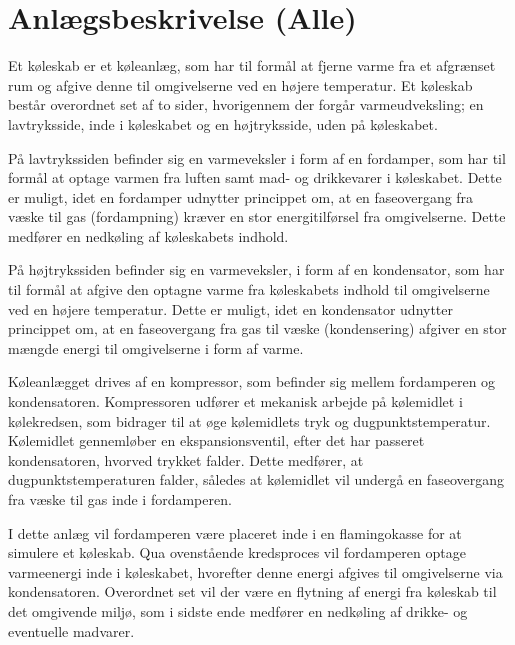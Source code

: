 \documentclass[../Hovedrapport.tex]{subfiles}
\begin{document}

\section{Anlægsbeskrivelse  (Alle)}
    \label{sec:anlaegsbeskrivelse}
Et køleskab er et køleanlæg, som har til formål at fjerne varme fra et afgrænset rum og afgive denne til omgivelserne ved en højere temperatur. Et køleskab består overordnet set af to sider, hvorigennem der forgår varmeudveksling; en lavtryksside, inde i køleskabet og en højtryksside, uden på køleskabet. 

På lavtrykssiden befinder sig en varmeveksler i form af en fordamper, som har til formål at optage varmen fra luften samt mad- og drikkevarer i køleskabet. Dette er muligt, idet en fordamper udnytter princippet om, at en faseovergang fra væske til gas (fordampning) kræver en stor energitilførsel fra omgivelserne. Dette medfører en nedkøling af køleskabets indhold.

På højtrykssiden befinder sig en varmeveksler, i form af en kondensator, som har til formål at afgive den optagne varme fra køleskabets indhold til omgivelserne ved en højere temperatur. Dette er muligt, idet en kondensator udnytter princippet om, at en faseovergang fra gas til væske (kondensering) afgiver en stor mængde energi til omgivelserne i form af varme.

Køleanlægget drives af en kompressor, som befinder sig mellem fordamperen og kondensatoren. Kompressoren udfører et mekanisk arbejde på kølemidlet i kølekredsen, som bidrager til at øge kølemidlets tryk og dugpunktstemperatur. Kølemidlet gennemløber en ekspansionsventil, efter det har passeret kondensatoren, hvorved trykket falder. Dette medfører, at dugpunktstemperaturen falder, således at kølemidlet vil undergå en faseovergang fra væske til gas inde i fordamperen.

I dette anlæg vil fordamperen være placeret inde i en flamingokasse for at simulere et køleskab. Qua ovenstående kredsproces vil fordamperen optage varmeenergi inde i køleskabet, hvorefter denne energi afgives til omgivelserne via kondensatoren. Overordnet set vil der være en flytning af energi fra køleskab til det omgivende miljø, som i sidste ende medfører en nedkøling af drikke- og eventuelle madvarer. 
\end{document}
